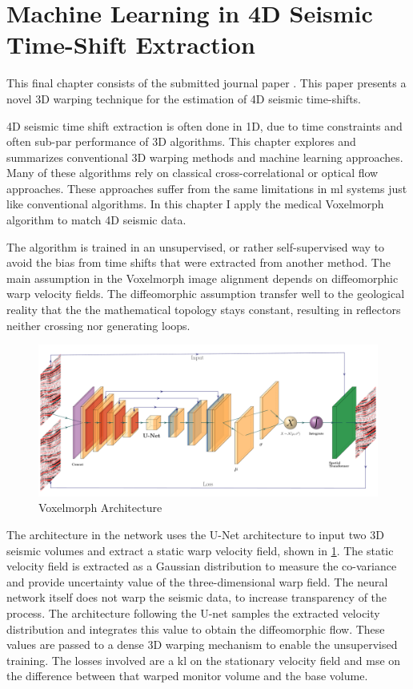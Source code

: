 \section{Machine Learning in 4D Seismic Time-Shift Extraction}

This final chapter consists of the submitted journal paper . This paper presents a novel 3D warping technique for the estimation of 4D seismic time-shifts.

4D seismic time shift extraction is often done in 1D, due to time constraints and often sub-par performance of 3D algorithms. This chapter explores and summarizes conventional 3D warping methods and machine learning approaches. Many of these algorithms rely on classical cross-correlational or optical flow approaches. These approaches suffer from the same limitations in \acl{ml} systems just like conventional algorithms. In this chapter I apply the medical Voxelmorph algorithm to match 4D seismic data.

The algorithm is trained in an unsupervised, or rather self-supervised way to avoid the bias from time shifts that were extracted from another method. The main assumption in the Voxelmorph image alignment depends on diffeomorphic warp velocity fields. The diffeomorphic assumption transfer well to the geological reality that the the mathematical topology stays constant, resulting in reflectors neither crossing nor generating loops. 

\begin{figure}
    \centering
    \includegraphics[width=\textwidth]{figures/Voxelmorph.pdf}
    \caption{Voxelmorph Architecture \citep[from][]{dramsch20193dwarping}}
    \label{fig:voxelmorph}
\end{figure}

The architecture in the network uses the U-Net architecture to input two 3D seismic volumes and extract a static warp velocity field, shown in \cref{fig:voxelmorph}. The static velocity field is extracted as a Gaussian distribution to measure the co-variance and provide uncertainty value of the three-dimensional warp field. The neural network itself does not warp the seismic data, to increase transparency of the process. The architecture following the U-net samples the extracted velocity distribution and integrates this value to obtain the diffeomorphic flow. These values are passed to a dense 3D warping mechanism to enable the unsupervised training. The losses involved are a \acf{kl} on the stationary velocity field and \ac{mse} on the difference between that warped monitor volume and the base volume.

